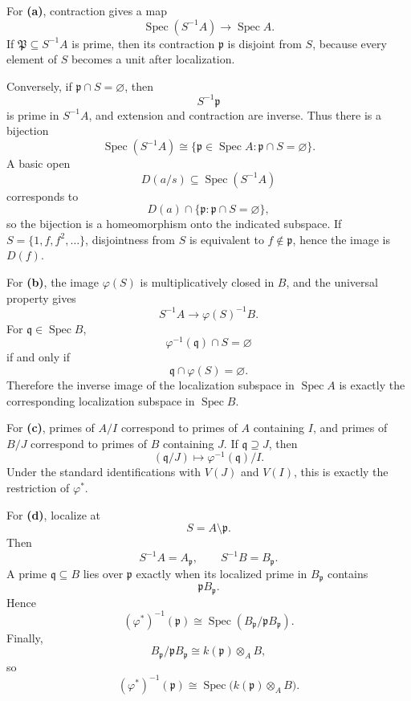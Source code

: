 \begin{solution}
For \textbf{(a)}, contraction gives a map
\[
\operatorname{Spec}(S^{-1}A)\longrightarrow\operatorname{Spec}A.
\]
If \(\mathfrak P\subseteq S^{-1}A\) is prime, then its contraction
\(\mathfrak p\) is disjoint from \(S\), because every element of \(S\) becomes
a unit after localization.

Conversely, if \(\mathfrak p\cap S=\varnothing\), then
\[
S^{-1}\mathfrak p
\]
is prime in \(S^{-1}A\), and extension and contraction are inverse. Thus there
is a bijection
\[
\operatorname{Spec}(S^{-1}A)
\cong
\{\mathfrak p\in\operatorname{Spec}A:\mathfrak p\cap S=\varnothing\}.
\]
A basic open
\[
D(a/s)\subseteq\operatorname{Spec}(S^{-1}A)
\]
corresponds to
\[
D(a)\cap\{\mathfrak p:\mathfrak p\cap S=\varnothing\},
\]
so the bijection is a homeomorphism onto the indicated subspace. If
\(S=\{1,f,f^2,\dots\}\), disjointness from \(S\) is equivalent to
\(f\notin\mathfrak p\), hence the image is \(D(f)\).

For \textbf{(b)}, the image \(\varphi(S)\) is multiplicatively closed in \(B\),
and the universal property gives
\[
S^{-1}A\longrightarrow\varphi(S)^{-1}B.
\]
For \(\mathfrak q\in\operatorname{Spec}B\),
\[
\varphi^{-1}(\mathfrak q)\cap S=\varnothing
\]
if and only if
\[
\mathfrak q\cap\varphi(S)=\varnothing.
\]
Therefore the inverse image of the localization subspace in
\(\operatorname{Spec}A\) is exactly the corresponding localization subspace in
\(\operatorname{Spec}B\).

For \textbf{(c)}, primes of \(A/I\) correspond to primes of \(A\) containing
\(I\), and primes of \(B/J\) correspond to primes of \(B\) containing \(J\).
If \(\mathfrak q\supseteq J\), then
\[
(\mathfrak q/J)\longmapsto \varphi^{-1}(\mathfrak q)/I.
\]
Under the standard identifications with \(V(J)\) and \(V(I)\), this is exactly
the restriction of \(\varphi^*\).

For \textbf{(d)}, localize at
\[
S=A\setminus\mathfrak p.
\]
Then
\[
S^{-1}A=A_{\mathfrak p},
\qquad
S^{-1}B=B_{\mathfrak p}.
\]
A prime \(\mathfrak q\subseteq B\) lies over \(\mathfrak p\) exactly when its
localized prime in \(B_{\mathfrak p}\) contains
\[
\mathfrak pB_{\mathfrak p}.
\]
Hence
\[
(\varphi^*)^{-1}(\mathfrak p)
\cong
\operatorname{Spec}
\left(
B_{\mathfrak p}/\mathfrak pB_{\mathfrak p}
\right).
\]
Finally,
\[
B_{\mathfrak p}/\mathfrak pB_{\mathfrak p}
\cong
k(\mathfrak p)\otimes_A B,
\]
so
\[
(\varphi^*)^{-1}(\mathfrak p)
\cong
\operatorname{Spec}\bigl(k(\mathfrak p)\otimes_A B\bigr).
\]
\end{solution}


